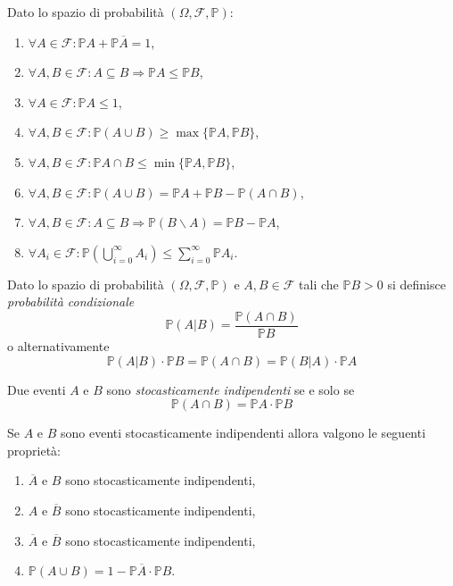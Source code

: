 \begin{mtpro}
	Dato lo spazio di probabilità $(\Omega, \mathcal{F}, \mathbb{P})$:
	\begin{enumerate}
		\item $\forall A \in \mathcal{F}: \mathbb{P}A + \mathbb{P}\overline{A} = 1$,
		\item $\forall A,B \in \mathcal{F} : A \subseteq B \Rightarrow \mathbb{P} A \leq \mathbb{P} B$,
		\item $\forall A \in \mathcal{F} : \mathbb{P} A \leq 1$,
		\item $\forall A, B \in \mathcal{F} : \mathbb{P}(A\cup B) \geq \max\{\mathbb{P}A, \mathbb{P}B\}$,
		\item $\forall A, B \in \mathcal{F} : \mathbb{P}{A\cap B} \leq \min \{\mathbb{P}A,\mathbb{P}B\}$,
		\item $\forall A,B \in \mathcal{F} : \mathbb{P}(A\cup B) = \mathbb{P}A + \mathbb{P}B - \mathbb{P}(A\cap B)$,
		\item $\forall A,B \in \mathcal{F} : A \subseteq B \Rightarrow \mathbb{P}(B \backslash A) = \mathbb{P}B - \mathbb{P}A$,
		\item $\forall A_i \in \mathcal{F} : \mathbb{P}\left( \bigcup_{i=0}^\infty A_i \right) \leq \sum_{i=0}^\infty \mathbb{P} A_i$.
	\end{enumerate}
\end{mtpro}

\begin{mtdef}
	Dato lo spazio di probabilità $(\Omega, \mathcal{F}, \mathbb{P})$ e $A,B \in \mathcal{F}$ tali che $\mathbb{P}B > 0$ si definisce \emph{probabilità condizionale}
	$$ \mathbb{P}(A | B) = \frac{\mathbb{P}(A \cap B)}{\mathbb{P}B} $$
	o alternativamente
	$$ \mathbb{P}(A | B) \cdot \mathbb{P}B = \mathbb{P}(A \cap B) = \mathbb{P}(B | A) \cdot \mathbb{P}A $$
\end{mtdef}

\begin{mtdef}
	Due eventi $A$ e $B$ sono \emph{stocasticamente indipendenti} se e solo se
	$$ \mathbb{P}(A\cap B) = \mathbb{P}A \cdot \mathbb{P}B$$
\end{mtdef}

\begin{mtpro}
	Se $A$ e $B$ sono eventi stocasticamente indipendenti allora valgono le seguenti proprietà:
	\begin{enumerate}
		\item $\overline{A}$ e $B$ sono stocasticamente indipendenti,
		\item $A$ e $\overline{B}$ sono stocasticamente indipendenti,
		\item $\overline{A}$ e $\overline{B}$ sono stocasticamente indipendenti,
		\item $\mathbb{P}(A\cup B) = 1 - \mathbb{P}\overline{A} \cdot \mathbb{P}B$.
	\end{enumerate}
\end{mtpro}

